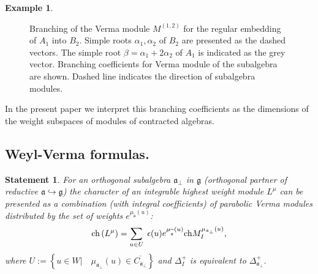 \documentclass[12pt]{article}
\newtheorem{statement}{Statement}
\theoremstyle{definition}
\newtheorem{example}{Example}
\newcommand{\gf}{\mathfrak{g}}
\newcommand{\af}{\mathfrak{a}}
\newcommand{\aft}{\widetilde{\mathfrak{a}}}
\newcommand{\afb}{\mathfrak{a}_{\bot}}
\begin{document}
\begin{example}
\begin{figure}[h!bt]
  \noindent{}
  \caption{Branching of the Verma module $M^{(1,2)}$ for the regular embedding of $A_1$ into $B_2$. Simple roots $\alpha_1, \alpha_2$ of $B_2$ are presented as the dashed vectors.
    The simple root $\beta = \alpha_1+2\alpha_2$ of $A_1$ is indicated as the grey vector.
    Branching coefficients for Verma module of the subalgebra are shown. Dashed line indicates the
    direction of subalgebra modules.}
 \label{fig:B2_Verma_Branch2}
\end{figure}
\end{example}
In the present paper we interpret this branching coefficients as the dimensions
of the weight subspaces of modules of contracted algebras.

\subsection{Weyl-Verma formulas.}

\begin{statement}
\bigskip For an orthogonal subalgebra $\afb$ in $\gf$
(orthogonal partner of reductive $\af\hookrightarrow \gf$) the
character of an integrable highest weight module $L^{\mu }$ can be presented
as a combination (with integral coefficients) of parabolic Verma modules
distributed by the set of weights $e^{\mu _{\aft}\left( u\right) }$:
\begin{equation*}
\mathrm{ch}\left( L^{\mu }\right) =\sum_{u\in U}\;\epsilon (u)e^{\mu _{%
\widetilde{\af}}\left( u\right) }\mathrm{ch}M_{I}^{\mu _{\af%
_{\perp }}\left( u\right) },
\end{equation*}
where $U:=\left\{ u\in W|\quad \mu _{\afb}\left( u\right) \in
\overline{C_{\afb}}\right\} $ and $\Delta _{I}^{+}$ is
equivalent to $\Delta _{\afb}^{+}$.
\end{statement}
\end{document}
